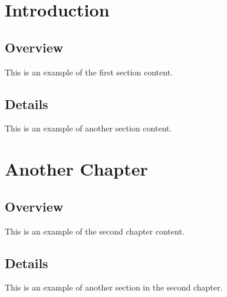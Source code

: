 \documentclass[openany, 11pt]{book}
\begin{document}
\chapter{Introduction}
\section{Overview}
This is an example of the first section content.

\section{Details}
This is an example of another section content.

\chapter{Another Chapter}
\section{Overview}
This is an example of the second chapter content.

\section{Details}
This is an example of another section in the second chapter.
\end{document}
